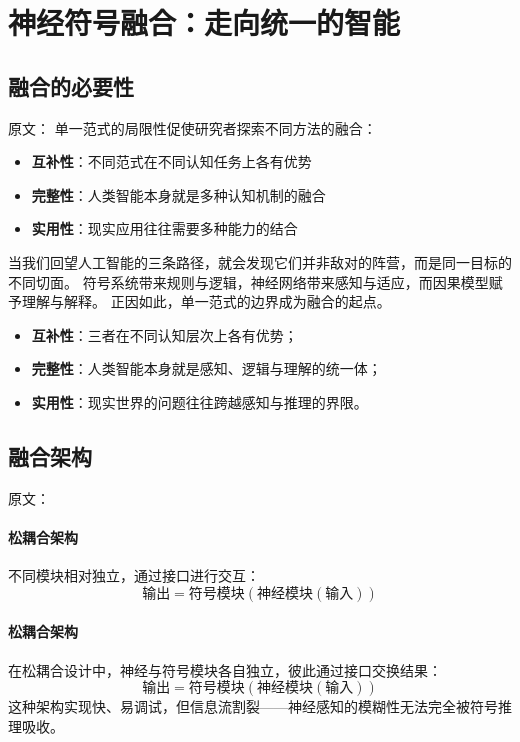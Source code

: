 \section{神经符号融合：走向统一的智能}

\subsection{融合的必要性}

原文：
单一范式的局限性促使研究者探索不同方法的融合：
\begin{itemize}
\item \textbf{互补性}：不同范式在不同认知任务上各有优势
\item \textbf{完整性}：人类智能本身就是多种认知机制的融合
\item \textbf{实用性}：现实应用往往需要多种能力的结合
\end{itemize}
当我们回望人工智能的三条路径，就会发现它们并非敌对的阵营，而是同一目标的不同切面。  
符号系统带来规则与逻辑，神经网络带来感知与适应，而因果模型赋予理解与解释。  
正因如此，单一范式的边界成为融合的起点。  
\begin{itemize}
\item \textbf{互补性}：三者在不同认知层次上各有优势；  
\item \textbf{完整性}：人类智能本身就是感知、逻辑与理解的统一体；  
\item \textbf{实用性}：现实世界的问题往往跨越感知与推理的界限。  
\end{itemize}

\subsection{融合架构}

原文：
\paragraph{松耦合架构}
不同模块相对独立，通过接口进行交互：
$$\text{输出} = \text{符号模块}(\text{神经模块}(\text{输入}))$$
\paragraph{松耦合架构}
在松耦合设计中，神经与符号模块各自独立，彼此通过接口交换结果：  
$$\text{输出} = \text{符号模块}(\text{神经模块}(\text{输入}))$$
这种架构实现快、易调试，但信息流割裂——神经感知的模糊性无法完全被符号推理吸收。

